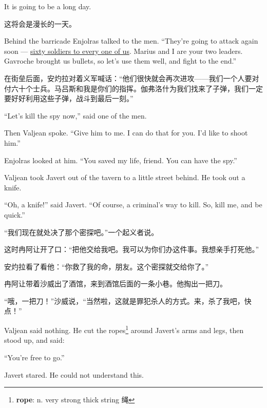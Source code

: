\documentclass[fontset=ubuntu, zihao=5]{ctexart}
\begin{document}
\begin{paracol}{2}
\switchcolumn*

It is going to be a long day.

\switchcolumn

这将会是漫长的一天。

\switchcolumn*

\sectionbreak

Behind the barricade Enjolras talked to the men. ``They're going to attack again
soon --- \uline{sixty soldiers to every one of us}. Marius and I are your two
leaders. Gavroche brought us bullets, so let's use them well, and fight to the
end.''

\switchcolumn

\sectionbreak

在街垒后面，安灼拉对着义军喊话：“他们很快就会再次进攻——我们一个人要对付六十个士兵。马吕斯和我是你们的指挥。伽弗洛什为我们找来了子弹，我们一定要好好利用这些子弹，战斗到最后一刻。”

\switchcolumn*

``Let's kill the spy now,'' said one of the men.


Then Valjean spoke. ``Give him to me. I can do that for you. I'd like to shoot him.''


Enjolras looked at him. ``You saved my life, friend. You can have the spy.''


Valjean took Javert out of the tavern to a little street behind. He took out a knife.

``Oh, a knife!'' said Javert. ``Of course, a criminal's way to kill. So, kill me, and be quick.''

\switchcolumn

“我们现在就处决了那个密探吧。”一个起义者说。

这时冉阿让开了口：“把他交给我吧。我可以为你们办这件事。我想亲手打死他。”

安灼拉看了看他：“你救了我的命，朋友。这个密探就交给你了。”

冉阿让带着沙威出了酒馆，来到酒馆后面的一条小巷。他掏出一把刀。

“哦，一把刀！”沙威说，“当然啦，这就是罪犯杀人的方式。来，杀了我吧，快点！”

\switchcolumn*

Valjean said nothing. He cut the ropes\footnote{\textbf{rope}: n. very
  strong thick string 绳} around Javert's arms and legs, then stood up, and
said:

``You're free to go.''

Javert stared. He could not understand this.



\end{paracol}
\end{document}

